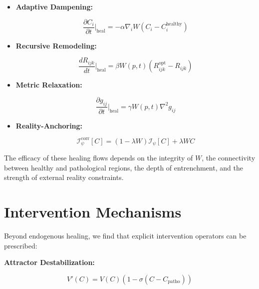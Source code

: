 \begin{itemize}

    \item \textbf{Adaptive Dampening:}

    \begin{equation}
    \frac{\partial C_i}{\partial t}\bigg|_{\text{heal}} = -\alpha \nabla_i W (C_i - C_i^{\text{healthy}})
    \end{equation}

    \item \textbf{Recursive Remodeling:}

    \begin{equation}
    \frac{dR_{ijk}}{dt}\bigg|_{\text{heal}} = \beta W(p,t) (R_{ijk}^{\text{opt}} - R_{ijk})
    \end{equation}

    \item \textbf{Metric Relaxation:}

    \begin{equation}
    \frac{\partial g_{ij}}{\partial t}\bigg|_{\text{heal}} = \gamma W(p,t) \nabla^2 g_{ij}
    \end{equation}

    \item \textbf{Reality-Anchoring:}

    \begin{equation}
    \mathcal{I}_{\psi}^{\text{corr}}[C] = (1-\lambda W)\mathcal{I}_{\psi}[C] + \lambda W C
    \end{equation}

\end{itemize}

The efficacy of these healing flows depends on the integrity of $W$, the connectivity between healthy and pathological regions, the depth of entrenchment, and the strength of external reality constraints.


\section{Intervention Mechanisms}
\label{16.6:intervention_mechanisms}

Beyond endogenous healing, we find that explicit intervention operators can be prescribed:

\textbf{Attractor Destabilization:}

\begin{equation}
V'(C) = V(C) (1 - \sigma(C - C_{\text{patho}}))
\end{equation}

